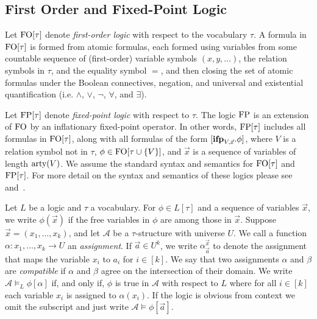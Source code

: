 \documentclass[../paper.tex]{subfiles}
\begin{document}
\subsection{First Order and Fixed-Point Logic}
Let $\text{\upshape FO}[\tau]$ denote \emph{first-order logic} with respect to the vocabulary
$\tau$. A formula in $\text{\upshape FO}[\tau]$ is formed from atomic formulas, each formed
using variables from some countable sequence of (first-order) variable symbols
$(x, y, \ldots)$, the relation symbols in $\tau$, and the equality symbol $=$,
and then closing the set of atomic formulas under the Boolean connectives,
negation, and universal and existential quantification (i.e. $\land$, $\lor$,
$\neg$, $\forall$, and $\exists$).

Let $\text{\upshape FP}[\tau]$ denote \emph{fixed-point logic} with respect to $\tau$. The
logic $\text{\upshape FP}$ is an extension of $\text{\upshape FO}$ by an inflationary fixed-point operator. In
other words, $\text{\upshape FP}[\tau]$ includes all formulas in $\text{\upshape FO}[\tau]$, along with all
formulas of the form $[\text{\textbf{ifp}}_{V, \vec{x}}. \phi]$, where $V$ is a relation symbol
not in $\tau$, $\phi \in \text{\upshape FO}[\tau \cup \{V\}]$, and $\vec{x}$ is a sequence of
variables of length $\mathrm{arty}(V)$. We assume the standard syntax and semantics for
$\text{\upshape FO}[\tau]$ and $\text{\upshape FP}[\tau]$. For more detail on the syntax and semantics of
these logics please see~\cite{grohe2017descriptive} and~\cite{GradelP15a}.

Let $L$ be a logic and $\tau$ a vocabulary. For $\phi \in L[\tau]$ and a
sequence of variables $\vec{x}$, we write $\phi(\vec{x})$ if the free variables
in $\phi$ are among those in $\vec{x}$. Suppose $\vec{x} = (x_1, \ldots , x_k)$,
and let $\mathcal{A}$ be a $\tau$-structure with universe $U$. We call a
function $\alpha : {x_1, \ldots, x_k} \rightarrow U$ an \emph{assignment}. If
$\vec{a}\in U^k$, we write $\alpha^{\vec{x}}_{\vec{a}}$ to denote the assignment
that maps the variable $x_i$ to $a_i$ for $i \in [k]$. We say that two
assignments $\alpha$ and $\beta$ are \emph{compatible} if $\alpha$ and $\beta$
agree on the intersection of their domain. We write $\mathcal{A} \models_L
\phi[\alpha]$ if, and only if, $\phi$ is true in $\mathcal{A}$ with respect to
$L$ where for all $i \in [k]$ each variable $x_i$ is assigned to $\alpha(x_i)$.
If the logic is obvious from context we omit the subscript and just write
$\mathcal{A} \models \phi[\vec{a}]$.
\end{document}
